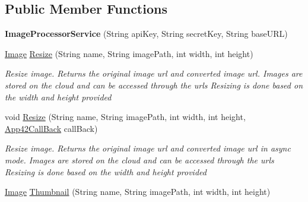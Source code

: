 \subsection*{Public Member Functions}
\begin{DoxyCompactItemize}
\item 
\hypertarget{classcom_1_1shephertz_1_1app42_1_1paas_1_1sdk_1_1csharp_1_1image_processor_1_1_image_processor_service_a6d52f18e5e37503e21cdd0258831ed4d}{{\bfseries Image\+Processor\+Service} (String api\+Key, String secret\+Key, String base\+U\+R\+L)}\label{classcom_1_1shephertz_1_1app42_1_1paas_1_1sdk_1_1csharp_1_1image_processor_1_1_image_processor_service_a6d52f18e5e37503e21cdd0258831ed4d}

\item 
\hyperlink{classcom_1_1shephertz_1_1app42_1_1paas_1_1sdk_1_1csharp_1_1image_processor_1_1_image}{Image} \hyperlink{classcom_1_1shephertz_1_1app42_1_1paas_1_1sdk_1_1csharp_1_1image_processor_1_1_image_processor_service_aa44d1dad36e6a0bf2c5f7ec6c914bd20}{Resize} (String name, String image\+Path, int width, int height)
\begin{DoxyCompactList}\small\item\em Resize image. Returns the original image url and converted image url. Images are stored on the cloud and can be accessed through the urls Resizing is done based on the width and height provided \end{DoxyCompactList}\item 
void \hyperlink{classcom_1_1shephertz_1_1app42_1_1paas_1_1sdk_1_1csharp_1_1image_processor_1_1_image_processor_service_a548cd176c784a8bb6bc9670a248d6ab9}{Resize} (String name, String image\+Path, int width, int height, \hyperlink{interfacecom_1_1shephertz_1_1app42_1_1paas_1_1sdk_1_1csharp_1_1_app42_call_back}{App42\+Call\+Back} call\+Back)
\begin{DoxyCompactList}\small\item\em Resize image. Returns the original image url and converted image url in async mode. Images are stored on the cloud and can be accessed through the urls Resizing is done based on the width and height provided \end{DoxyCompactList}\item 
\hyperlink{classcom_1_1shephertz_1_1app42_1_1paas_1_1sdk_1_1csharp_1_1image_processor_1_1_image}{Image} \hyperlink{classcom_1_1shephertz_1_1app42_1_1paas_1_1sdk_1_1csharp_1_1image_processor_1_1_image_processor_service_ae762d4121220473ef2c12551010e916f}{Thumbnail} (String name, String image\+Path, int width, int height)

\end{DoxyCompactItemize}
